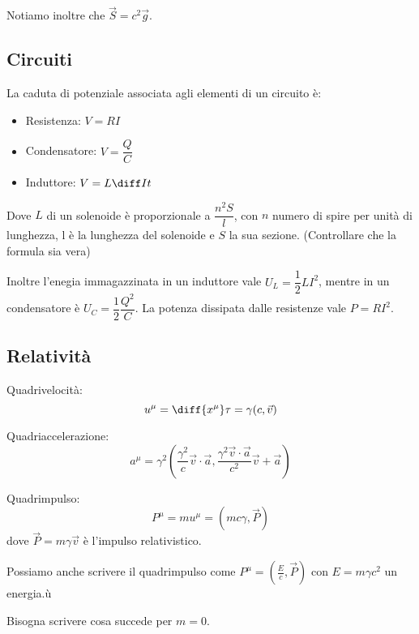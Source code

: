 \documentclass[a4paper,10pt,oneside]{math_article}
\begin{document}
			Notiamo inoltre che $\vec S = c^2 \vec g$.			

		\subsection{Circuiti}
			La caduta di potenziale associata agli elementi di un circuito è:
			\begin{itemize}
			 \item Resistenza: $V=RI$
			 \item Condensatore: $V=\dfrac QC$
			 \item Induttore: $V=L\diff It$
			\end{itemize}
			
			Dove $L$ di un solenoide è proporzionale a $\dfrac{n^2S}{l}$, con $n$ numero di spire per unità di lunghezza, l è la lunghezza del solenoide e $S$ la sua sezione. (Controllare che la formula sia vera)
			
			Inoltre l'enegia immagazzinata in un induttore vale $U_L=\dfrac12 LI^2$, mentre in un condensatore è $U_C=\dfrac12 \dfrac{Q^2}C$. La potenza dissipata dalle resistenze vale $P=RI^2$. 

		\subsection{Relatività}
			Quadrivelocità:
			\begin{equation}
				u^\mu = \diff{x^\mu}\tau = \gamma(c, \vec v)
			\end{equation}

			Quadriaccelerazione:
			\begin{equation}
				a^\mu = \gamma^2\left( \frac{\gamma^2}c \vec v \cdot \vec a, \frac{\gamma^2\vec v \cdot \vec a}{c^2} \vec v + \vec a\right)
			\end{equation}
						
			Quadrimpulso:
			\begin{equation}
				P^\mu = mu^\mu = (mc\gamma, \vec P)
			\end{equation}
			dove $\vec P = m\gamma \vec v$ è l'impulso relativistico.
			
			Possiamo anche scrivere il quadrimpulso come $P^\mu = (\frac Ec, \vec P)$ con $E=m\gamma c^2$ un energia.ù
			
			Bisogna scrivere cosa succede per $m=0$.
			
\end{document}
